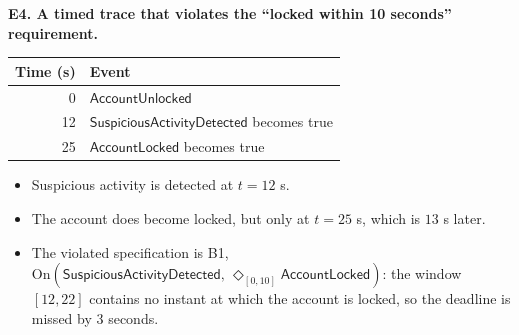 \documentclass[a4paper, 11pt]{article}
\newcommand{\ap}[1]{\mathsf{#1}}
\newcommand{\AL}{\ap{AccountLocked}}
\newcommand{\AU}{\ap{AccountUnlocked}}
\newcommand{\SA}{\ap{SuspiciousActivityDetected}}
\newcommand{\F}{\Diamond}
\newcommand{\On}[2]{\mathrm{On}(#1,\,#2)}
\begin{document}
\begin{solution}
\medskip
{}
\noindent\textbf{E4. A timed trace that violates the ``locked within 10 seconds'' requirement.}
\begin{center}
\begin{tabular}{r|l}
\hline
Time (s) & Event \\
\hline
0 & $\AU$ \\
12 & $\SA$ becomes true \\
25 & $\AL$ becomes true \\
\hline
\end{tabular}
\end{center}
\begin{itemize}
    \item Suspicious activity is detected at $t=12$ s.
    \item The account does become locked, but only at $t=25$ s, which is $13$ s later.
    \item The violated specification is B1, $\On{\SA}{\F_{[0,10]}\AL}$: the window $[12,22]$ contains no instant at which the account is locked, so the deadline is missed by $3$ seconds.
\end{itemize}
\end{solution}
\problemend
\end{document}
